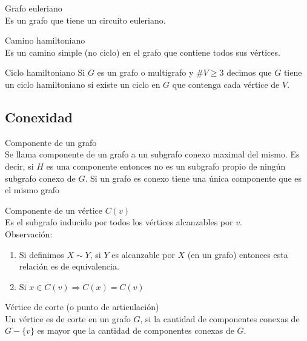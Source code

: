 \documentclass{article}
\begin{document}
\begin{defn}
Grafo euleriano \\ Es un grafo que tiene un circuito euleriano.
\end{defn}

\begin{defn}
Camino hamiltoniano \\ Es un camino simple (no ciclo) en el grafo que contiene todos sus vértices.
\end{defn}

\begin{defn}
Ciclo hamiltoniano Si $G$ es un grafo o multigrafo y $\# V \geq 3$ decimos que $G$ tiene un ciclo hamiltoniano si existe un ciclo en $G$ que contenga cada vértice de $V$.
\end{defn}

\subsection{Conexidad}

\begin{defn}
Componente de un grafo\\ Se llama componente de un grafo a un subgrafo conexo maximal del mismo. Es decir, si $H$ es una componente entonces no es un subgrafo propio de ningún subgrafo conexo de $G$. Si un grafo es conexo tiene una única componente que es el mismo grafo
\end{defn}

\begin{defn}
Componente de un vértice $C(v)$ \\ Es el subgrafo inducido por todos los vértices alcanzables por $v$. \\
Observación:
\begin{enumerate}
    \item Si definimos $X \sim Y$, si $Y$ es alcanzable por $X$ (en un grafo) entonces esta relación es de equivalencia.
    \item Si $x \in C(v) \Rightarrow C(x)=C(v)$
\end{enumerate}
\end{defn}

\begin{defn}
Vértice de corte (o punto de articulación)\\ Un vértice es de corte en un grafo $G$, si la cantidad de componentes conexas de $G-\{v\}$ es mayor que la cantidad de componentes conexas de $G$.
\end{defn}
\end{document}
